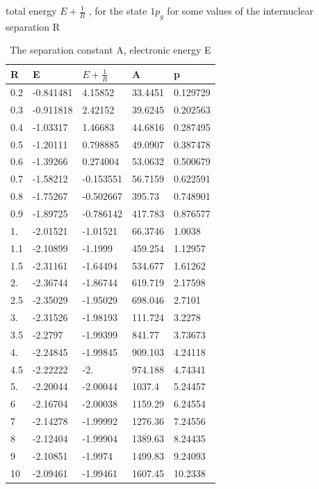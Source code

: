 \begin{table}[h!]
  \caption{ The separation constant A, electronic energy E}{ total energy $ E + \frac{1}{R} $ , for the state $ 1p_g $ for some values of the internuclear separation R } 
  \centering
  \label{2sg}
		\begin{tabular}{ m{6em} m{6em}  m{6em}  m{6em} m{6em} }
			\hline
			R & E & $ E + \frac{1}{R} $ & A & p  \\ \hline \hline
  0.2 & -0.841481 & 4.15852 & 33.4451 & 0.129729\\
  0.3 & -0.911818 & 2.42152 & 39.6245 & 0.202563\\
  0.4 & -1.03317 & 1.46683 & 44.6816 & 0.287495\\
  0.5 & -1.20111 & 0.798885 & 49.0907 & 0.387478\\
  0.6 & -1.39266 & 0.274004 & 53.0632 & 0.500679\\
  0.7 & -1.58212 & -0.153551 & 56.7159 & 0.622591\\
  0.8 & -1.75267 & -0.502667 & 395.73 & 0.748901\\
  0.9 & -1.89725 & -0.786142 & 417.783 & 0.876577\\
  1. & -2.01521 & -1.01521 & 66.3746 & 1.0038\\
  1.1 & -2.10899 & -1.1999 & 459.254 & 1.12957\\
  1.5 & -2.31161 & -1.64494 & 534.677 & 1.61262\\
  2. & -2.36744 & -1.86744 & 619.719 & 2.17598\\
  2.5 & -2.35029 & -1.95029 & 698.046 & 2.7101\\
  3. & -2.31526 & -1.98193 & 111.724 & 3.2278\\
  3.5 & -2.2797 & -1.99399 & 841.77 & 3.73673\\
  4. & -2.24845 & -1.99845 & 909.103 & 4.24118\\
  4.5 & -2.22222 & -2. & 974.188 & 4.74341\\
  5. & -2.20044 & -2.00044 & 1037.4 & 5.24457\\
  6 & -2.16704 & -2.00038 & 1159.29 & 6.24554\\
  7 & -2.14278 & -1.99992 & 1276.36 & 7.24556\\
  8 & -2.12404 & -1.99904 & 1389.63 & 8.24435\\
  9 & -2.10851 & -1.9974 & 1499.83 & 9.24093\\
  10 & -2.09461 & -1.99461 & 1607.45 & 10.2338\\
		\hline
		\end{tabular}
\end{table}

